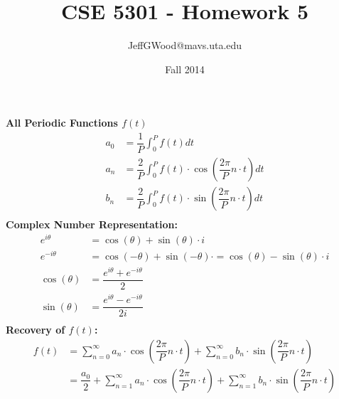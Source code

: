 \documentclass[a4paper,10pt]{article}
\title{CSE 5301 - Homework 5}
\author{JeffGWood@mavs.uta.edu}
\date{Fall 2014}
\begin{document}
\indent


\noindent\textbf{All Periodic Functions $f(t)$}
\newline\noindent\newline\noindent
\begin{equation*}
\begin{split}
a_0 &= \dfrac{1}{P}\int_{0}^{P}{f(t)dt}\\
a_n &= \dfrac{2}{P}\int_{0}^{P}{f(t)\cdot\cos\left(\dfrac{2\pi}{P}n\cdot t\right)dt}\\
b_n &= \dfrac{2}{P}\int_{0}^{P}{f(t)\cdot\sin\left(\dfrac{2\pi}{P}n\cdot t\right)dt}\\
\end{split}
\end{equation*}
\newline\noindent\newline\noindent
\noindent\textbf{Complex Number Representation:}
\newline\noindent\newline\noindent
\begin{equation*}
\begin{split}
e^{i\theta} &= \cos\left(\theta\right)+\sin\left(\theta\right)\cdot i\\
e^{-i\theta} &= \cos\left(-\theta\right)+\sin\left(-\theta\right)\cdot = \cos\left(\theta\right)-\sin\left(\theta\right)\cdot i\\
\cos\left(\theta\right) &= \dfrac{e^{i\theta} + e^{-i\theta}}{2}\\
\sin\left(\theta\right) &= \dfrac{e^{i\theta} - e^{-i\theta}}{2\textit{i}}\\ 
\end{split}
\end{equation*}
\newline\noindent\newline\noindent
\noindent\textbf{Recovery of $f(t)$:}
\newline\noindent\newline\noindent
\begin{equation*}
\begin{split}
f\left(t\right) &=
\displaystyle\sum_{n=0}^{\infty}{a_n\cdot \cos\left(\dfrac{2\pi}{P}n\cdot t\right)}+
\displaystyle\sum_{n=0}^{\infty}{b_n\cdot \sin\left(\dfrac{2\pi}{P}n\cdot t\right)}\\
&= \dfrac{a_0}{2}+
\displaystyle\sum_{n=1}^{\infty}{a_n\cdot \cos\left(\dfrac{2\pi}{P}n\cdot t\right)}+
\displaystyle\sum_{n=1}^{\infty}{b_n\cdot \sin\left(\dfrac{2\pi}{P}n\cdot t\right)}\\
\end{split}
\end{equation*}
\end{document}
